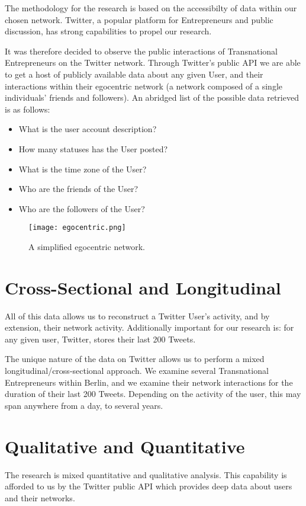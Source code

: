 The methodology for the research is based on the accessibilty of data
within our chosen network. Twitter, a popular platform for
Entrepreneurs and public discussion, has strong capabilities to propel
our research.

It was therefore decided to observe the public interactions of
Transnational Entrepreneurs on the Twitter network. Through Twitter's
public API we are able to get a host of publicly available data about
any given User, and their interactions within their egocentric network
(a network composed of a single individuals' friends and
followers). An abridged list of the possible data retrieved is as
follows:

\begin{itemize}
\item What is the user account description?
\item How many statuses has the User posted?
\item What is the time zone of the User?
\item Who are the friends of the User?
\item Who are the followers of the User?
\end{itemize}

\begin{figure}[!ht]
  \centering
  \texttt{[image: egocentric.png]}
  \caption{A simplified egocentric network.}
\end{figure}

\section{Cross-Sectional and Longitudinal}
All of this data allows us to reconstruct a Twitter User's activity,
and by extension, their network activity. Additionally important for
our research is: for any given user, Twitter, stores their last
200 Tweets.

The unique nature of the data on Twitter allows us to perform a mixed
longitudinal/cross-sectional approach. We examine several
Transnational Entrepreneurs within Berlin, and we examine their
network interactions for the duration of their last 200
Tweets. Depending on the activity of the user, this may span anywhere
from a day, to several years.

\section{Qualitative and Quantitative}
The research is mixed quantitative and qualitative analysis. This
capability is afforded to us by the Twitter public API which provides
deep data about users and their networks.

